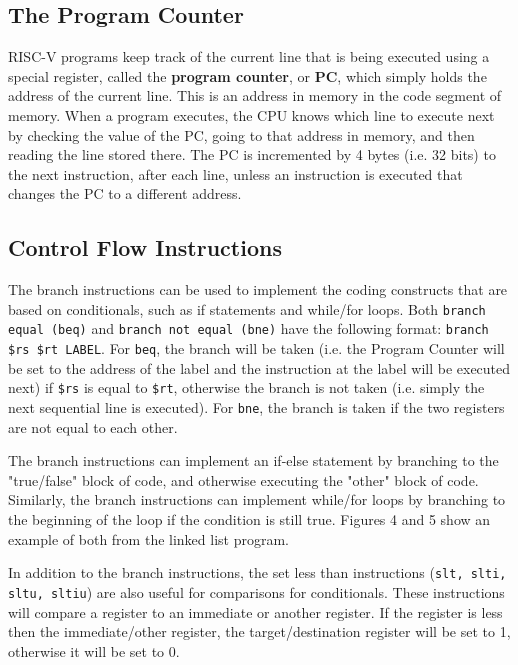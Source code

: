 \documentclass{article}
\begin{document}
\subsection{The Program Counter}
RISC-V programs keep track of the current line that is being executed using a special register, called the \textbf{program counter}, or \textbf{PC}, which simply holds the address of the current line. This is an address in memory in the code segment of memory. When a program executes, the CPU knows which line to execute next by checking the value of the PC, going to that address in memory, and then reading the line stored there. The PC is incremented by 4 bytes (i.e. 32 bits) to the next instruction, after each line, unless an instruction is executed that changes the PC to a different address.

\subsection{Control Flow Instructions}
The branch instructions can be used to implement the coding constructs that are based on conditionals, such as if statements and while/for loops. Both \texttt{branch equal (beq)} and \texttt{branch not equal (bne)} have the following format: \texttt{branch \$rs \$rt LABEL}. For \texttt{beq}, the branch will be taken (i.e. the Program Counter will be set to the address of the label and the instruction at the label will be executed next) if \texttt{\$rs} is equal to \texttt{\$rt}, otherwise the branch is not taken (i.e. simply the next sequential line is executed). For \texttt{bne}, the branch is taken if the two registers are not equal to each other. 

The branch instructions can implement an if-else statement by branching to the "true/false" block of code, and otherwise executing the "other" block of code. Similarly, the branch instructions can implement while/for loops by branching to the beginning of the loop if the condition is still true. Figures 4 and 5 show an example of both from the linked list program.

In addition to the branch instructions, the set less than instructions (\texttt{slt, slti, sltu, sltiu}) are also useful for comparisons for conditionals. These instructions will compare a register to an immediate or another register. If the register is less then the immediate/other register, the target/destination register will be set to 1, otherwise it will be set to 0.
\end{document}
